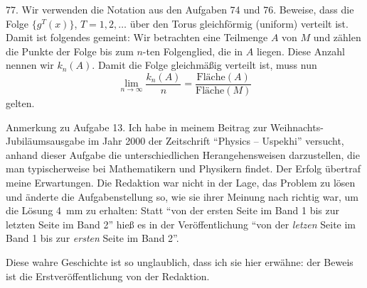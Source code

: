 \begin{problem}{77.}
	Wir verwenden die Notation aus den Aufgaben 74 und 76. Beweise, dass die Folge $\{g^T (x)\}$, $T=1, 2, \dotsc$ über den Torus gleichförmig (uniform) verteilt ist. Damit ist folgendes gemeint: 
	Wir betrachten eine Teilmenge $A$ von $M$ und zählen die Punkte der Folge bis zum $n$-ten Folgenglied, die in $A$ liegen. Diese Anzahl nennen wir $k_n(A)$. 
	Damit die Folge gleichmäßig verteilt ist, muss nun 
	\begin{equation*}
		\lim_{n \to \infty} \frac{k_n(A)}{n}=\frac{{\text{Fläche}} (A)}{{\text{Fläche}} (M)}
	\end{equation*}
	gelten.
\end{problem}

\vfill

\begin{note}{Anmerkung zu Aufgabe 13.}
	Ich habe in meinem Beitrag zur Weih\-nachts-Jubiläumsausgabe im Jahr 2000 der Zeitschrift \enquote{Physics -- Uspe\-khi} versucht, anhand dieser Aufgabe die unterschiedlichen Herangehensweisen darzustellen, die man typischerweise bei Mathematikern und Physikern findet. Der Erfolg übertraf meine Erwartungen. Die Redaktion war nicht in der Lage, das Problem zu lösen und änderte die Aufgabenstellung so, wie sie ihrer Meinung nach richtig war, um die Lösung \SI{4}{\mm} zu erhalten: Statt \enquote{von der ersten Seite im Band 1 bis zur letzten Seite im Band 2} hieß es in der Veröffentlichung \enquote{von der \emph{letzen} Seite im Band 1 bis zur \emph{ersten} Seite im Band 2}. 

	Diese wahre Geschichte ist so unglaublich, dass ich sie hier erwähne: der Beweis ist die Erstveröffentlichung von der Redaktion.
\end{note}
\clearpage

